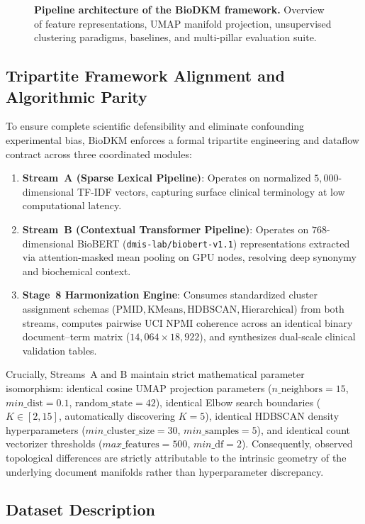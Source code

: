 \documentclass[a4paper,fleqn]{cas-dc}
\begin{document}
\begin{figure}[!t]
{\begin{tikzpicture}
\end{tikzpicture}%
}
\caption{\textbf{Pipeline architecture of the BioDKM framework.} Overview of feature representations, UMAP manifold projection, unsupervised clustering paradigms, baselines, and multi-pillar evaluation suite.}
\label{fig:pipeline}
\end{figure}

\subsection{Tripartite Framework Alignment and Algorithmic Parity}

To ensure complete scientific defensibility and eliminate confounding experimental bias, BioDKM enforces a formal tripartite engineering and dataflow contract across three coordinated modules:
\begin{enumerate}
\item \textbf{Stream~A (Sparse Lexical Pipeline)}: Operates on normalized $5{,}000$-dimensional TF-IDF vectors, capturing surface clinical terminology at low computational latency.
\item \textbf{Stream~B (Contextual Transformer Pipeline)}: Operates on $768$-dimensional BioBERT (\texttt{dmis-lab/\allowbreak biobert-v1.1}) representations extracted via attention-masked mean pooling on GPU nodes, resolving deep synonymy and biochemical context.
\item \textbf{Stage~8 Harmonization Engine}: Consumes standardized cluster assignment schemas ($\text{PMID}, \text{KMeans}, \text{HDBSCAN}, \text{Hierarchical}$) from both streams, computes pairwise UCI NPMI coherence across an identical binary document--term matrix ($14{,}064 \times 18{,}922$), and synthesizes dual-scale clinical validation tables.
\end{enumerate}
Crucially, Streams~A and B maintain strict mathematical parameter isomorphism: identical cosine UMAP projection parameters ($n\_\text{neighbors}=15$, $min\_\text{dist}=0.1$, $\text{random\_state}=42$), identical Elbow search boundaries ($K \in [2, 15]$, automatically discovering $K=5$), identical HDBSCAN density hyperparameters ($min\_\text{cluster\_size}=30$, $min\_\text{samples}=5$), and identical count vectorizer thresholds ($max\_\text{features}=500$, $min\_\text{df}=2$). Consequently, observed topological differences are strictly attributable to the intrinsic geometry of the underlying document manifolds rather than hyperparameter discrepancy.

\subsection{Dataset Description}
\end{document}
